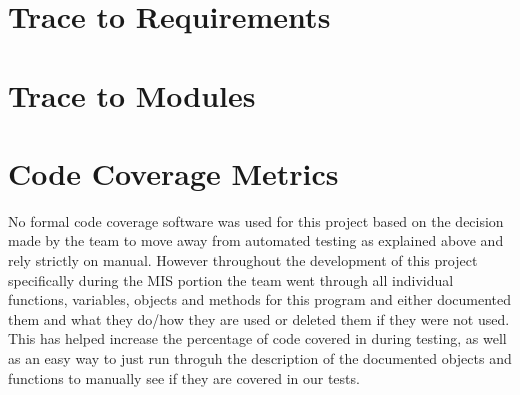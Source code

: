 \documentclass[12pt, titlepage]{article}
\begin{document}
\section{Trace to Requirements}

\section{Trace to Modules}

\section{Code Coverage Metrics}
No formal code coverage software was used for this project based on the decision made by the team to move away from automated testing as explained above and rely strictly on manual. However throughout the development of this project specifically during the MIS portion the team went through all individual functions, variables, objects and methods for this program and either documented them and what they do/how they are used or deleted them if they were not used. This has helped increase the percentage of code covered in during testing, as well as an easy way to just run throguh the description of the documented objects and functions to manually see if they are covered in our tests.





\end{document}

